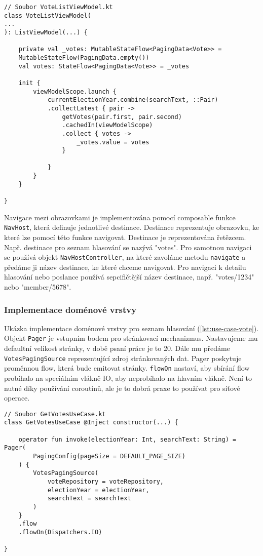 \begin{lstlisting}[caption={Ukázka využití view modelu}, label={lst:view-model}, tabsize=2]
// Soubor VoteListViewModel.kt
class VoteListViewModel(
...
): ListViewModel(...) {
	
	private val _votes: MutableStateFlow<PagingData<Vote>> =
	MutableStateFlow(PagingData.empty())
	val votes: StateFlow<PagingData<Vote>> = _votes
	
	init {
		viewModelScope.launch {
			currentElectionYear.combine(searchText, ::Pair)
			.collectLatest { pair ->
				getVotes(pair.first, pair.second)
				.cachedIn(viewModelScope)
				.collect { votes ->
					_votes.value = votes
				}
				
			}
		}
	}
	
}
\end{lstlisting}

\vspace{10px}

\noindent Navigace mezi obrazovkami je implementována pomocí composable funkce \lstinline|NavHost|, která definuje jednotlivé destinace. Destinace reprezentuje obrazovku, ke které lze pomocí této funkce navigovat. Destinace je reprezentována řetězcem. Např. destinace pro seznam hlasování se nazývá "votes". Pro samotnou navigaci se používá objekt \lstinline|NavHostController|, na které zavoláme metodu \lstinline|navigate| a předáme ji název destinace, ke které chceme navigovat. Pro navigaci k detailu hlasování nebo poslance používá sepcifičtější název destinace, např. "votes/1234" nebo "member/5678".

\subsubsection*{Implementace doménové vrstvy}
Ukázka implementace doménové vrstvy pro seznam hlasování (\ref{lst:use-case-vote}). Objekt \lstinline|Pager| je vstupním bodem pro stránkovací mechanizmus. Nastavujeme mu defaultní velikost stránky, v době psaní práce je to 20. Dále mu předáme \lstinline|VotesPagingSource| reprezentující zdroj stránkovaných dat. Pager poskytuje proměnnou flow, která bude emitovat stránky. \lstinline|flowOn| nastaví, aby sbírání flow probíhalo na speciálním vlákně IO, aby neprobíhalo na hlavním vlákně. Není to nutné díky používání coroutinů, ale je to dobrá praxe to používat pro síťové operace.

\begin{lstlisting}[caption={Ukázka využití use caseu pro získání seznamu hlasování}, label={lst:use-case-vote}, tabsize=2]
// Soubor GetVotesUseCase.kt
class GetVotesUseCase @Inject constructor(...) {
	
	operator fun invoke(electionYear: Int, searchText: String) = Pager(
		PagingConfig(pageSize = DEFAULT_PAGE_SIZE)
	) {
		VotesPagingSource(
			voteRepository = voteRepository,
			electionYear = electionYear,
			searchText = searchText
		)
	}
	.flow
	.flowOn(Dispatchers.IO)
	
}
\end{lstlisting}

